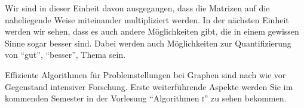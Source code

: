 Wir sind in dieser Einheit davon ausgegangen, dass die Matrizen auf
die naheliegende Weise miteinander multipliziert werden. In der
nächsten Einheit werden wir sehen, dass es auch andere Möglichkeiten
gibt, die in einem gewissen Sinne sogar besser sind. Dabei werden auch
Möglichkeiten zur Quantifizierung von "`gut"', "`besser"', \usw Thema
sein.

Effiziente Algorithmen für Problemstellungen bei Graphen sind nach wie
vor Gegenstand intensiver Forschung. Erste weiterführende Aspekte
werden Sie im kommenden Semester in der Vorlesung "`Algorithmen \textsc{i}"' zu
sehen bekommen.

\printunitbibliography

\cleardoublepage

